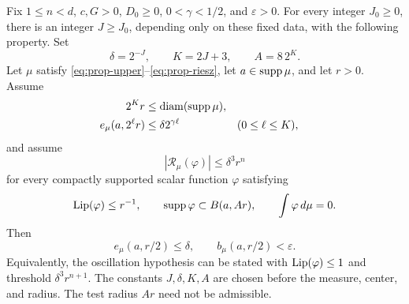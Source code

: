 \begin{theorem}
\label{thm:excess-propagation}
Fix $1\le n<d$, $c,G>0$, $D_0\ge0$, $0<\gamma<1/2$, and
$\varepsilon>0$. For every integer $J_0\ge0$, there is an integer
$J\ge J_0$, depending only on these fixed data, with the following
property. Set
\begin{equation}\label{eq:uniform-propagation-constants}
 \delta=2^{-J},\qquad K=2J+3,\qquad A=8\,2^K.
\end{equation}
Let $\mu$ satisfy \eqref{eq:prop-upper}--\eqref{eq:prop-riesz},
let $a\in\operatorname{supp}\mu$, and let $r>0$. Assume
\begin{align}
 2^Kr&\le\operatorname{diam}(\operatorname{supp}\mu),\label{eq:prop-admissible-horizon}\\
 e_\mu(a,2^\ell r)&\le\delta2^{\gamma\ell}
       &&(0\le\ell\le K),\label{eq:prop-horizon-assumption}
\end{align}
and assume
\begin{equation}\label{eq:prop-oscillation-assumption}
 |\mathcal R_\mu(\varphi)|\le\delta^3r^n
\end{equation}
for every compactly supported scalar function $\varphi$ satisfying
\[
 \operatorname{Lip}(\varphi)\le r^{-1},\qquad
 \operatorname{supp}\varphi\subset B(a,Ar),\qquad
 \int\varphi\,d\mu=0.
\]
Then
\begin{equation}\label{eq:uniform-propagation-conclusion}
 e_\mu(a,r/2)\le\delta,\qquad
 b_\mu(a,r/2)<\varepsilon.
\end{equation}
Equivalently, the oscillation hypothesis can be stated with
$\operatorname{Lip}(\varphi)\le1$ and threshold $\delta^3r^{n+1}$.
The constants $J,\delta,K,A$ are chosen before the measure, center,
and radius. The test radius $Ar$ need not be admissible.
\end{theorem}

